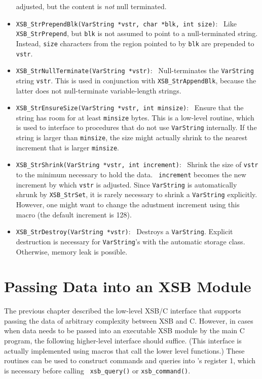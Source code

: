 \begin{itemize}
    adjusted, but the content is \emph{not} null terminated.
  \item {\tt XSB\_StrPrependBlk(VarString *vstr, char *blk, int size)}:~
    Like {\tt XSB\_StrPrepend}, but {\tt blk} is not assumed to point to a
    null-terminated string. Instead, {\tt size} characters from the region
    pointed to by {\tt blk} are prepended to {\tt vstr}.
  \item {\tt XSB\_StrNullTerminate(VarString *vstr)}:~
    Null-terminates the {\tt VarString}  string {\tt vstr}. This is used in
    conjunction with {\tt XSB\_StrAppendBlk}, because the latter does not
    null-terminate variable-length strings.
  \item {\tt XSB\_StrEnsureSize(VarString *vstr, int minsize)}:~
    Ensure that the string has room for at least {\tt minsize} bytes.
    This is a low-level routine, which is used to interface to procedures
    that do not use {\tt VarString} internally. If the string is larger
    than {\tt minsize}, the size might actually shrink to the nearest
    increment that is larger {\tt minsize}.
  \item {\tt XSB\_StrShrink(VarString *vstr, int increment)}:~ Shrink the
    size of {\tt vstr} to the minimum necessary to hold the data. {\tt
      increment} becomes the new increment by which {\tt vstr} is adjusted.
    Since {\tt VarString} is automatically shrunk by {\tt XSB\_StrSet}, it
    is rarely necessary to shrink a {\tt VarString} explicitly.  However,
    one might want to change the adustment increment using this macro (the
    default increment is 128).
  \item {\tt XSB\_StrDestroy(VarString *vstr)}:~
    Destroys a {\tt VarString}.  Explicit destruction is necessary for
    {\tt VarString}'s with the automatic storage class. Otherwise, memory
    leak is possible.
\end{itemize}


\section{Passing Data into an XSB Module}

The previous chapter described the low-level XSB/C interface that supports
passing the data of arbitrary complexity between XSB and C. However, in
cases when data needs to be passed into an executable XSB module by the
main C program, the following higher-level interface should suffice.  (This
interface is actually implemented using macros that call the lower level
functions.)  These routines can be used to construct commands and queries
into \ourprolog 's register 1, which is necessary before calling {\tt
  xsb\_query()} or {\tt xsb\_command()}.


